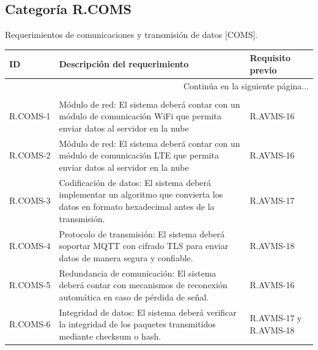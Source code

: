 \documentclass{article}%
\begin{document}
\subsection{Categoría R.COMS}%
\label{subsec:CategoraR.COMS}%
Requerimientos de comunicaciones y transmisión de datos [COMS].\newline%
\newline%
%
\begin{longtable}{|p{2cm}|p{9cm}|p{2.5cm}|}%
\hline%
ID&Descripción del requerimiento&Requisito previo\\%
\hline%
\endhead%
\hline%
\multicolumn{3}{|r|}{Continúa en la siguiente página...}\\%
\hline%
\endfoot%
\hline%
\multicolumn{3}{|r|}{Fin de la tabla}\\%
\hline%
\endlastfoot%
R.COMS{-}1& Módulo de red: El sistema deberá contar con un módulo de comunicación WiFi que permita enviar datos al servidor en la nube&R.AVMS{-}16\\%
\hline%
R.COMS{-}2& Módulo de red: El sistema deberá contar con un módulo de comunicación LTE que permita enviar datos al servidor en la nube&R.AVMS{-}16\\%
\hline%
R.COMS{-}3& Codificación de datos: El sistema deberá implementar un algoritmo que convierta los datos en formato hexadecimal antes de la transmisión.&R.AVMS{-}17\\%
\hline%
R.COMS{-}4& Protocolo de transmisión: El sistema deberá soportar MQTT con cifrado TLS para enviar datos de manera segura y confiable.&R.AVMS{-}18\\%
\hline%
R.COMS{-}5& Redundancia de comunicación: El sistema deberá contar con mecanismos de reconexión automática en caso de pérdida de señal.&R.AVMS{-}16\\%
\hline%
R.COMS{-}6& Integridad de datos: El sistema deberá verificar la integridad de los paquetes transmitidos mediante checksum o hash.&R.AVMS{-}17 y R.AVMS{-}18\\%
\hline%
\end{longtable}

%
\newpage%
\end{document}
